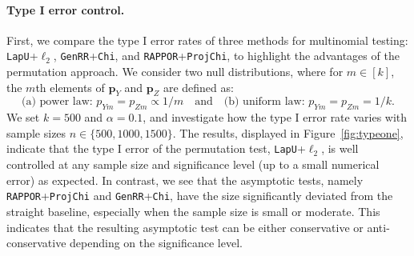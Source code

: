 \documentclass[twoside,11pt]{article}
\newcommand{\rvTwo}{Y}
\newcommand{\rvThree}{Z}
\newcommand{\vectorize}[1]{\mathbf{#1}}
\newcommand{\alphabetSize}{k} %
\newcommand{\vectorIndex}{m}
\newcommand{\probVecElement}[2]{p_{{#1}{#2}}}
\newcommand{\privacyParameter}{\alpha} %
\begin{document}
\paragraph{Type I error control.}
First, we compare the type I error rates of three methods for multinomial testing: \texttt{LapU}+\texttt{$\ell_2$}, \texttt{GenRR}+\texttt{Chi}, and \texttt{RAPPOR}+\texttt{ProjChi}, to highlight the advantages of the permutation approach. We consider two null distributions, where for \( m \in [\alphabetSize] \), the \( m \)th elements of \( \vectorize{p}_Y \) and \( \vectorize{p}_Z \) are defined as:
\begin{equation}\label{nulldist}
	\text{(a) power law: }\probVecElement{\rvTwo}{\vectorIndex} = \probVecElement{\rvThree}{\vectorIndex} \propto 1/\vectorIndex \quad \text{and} \quad \text{(b) uniform law: }\probVecElement{\rvTwo}{\vectorIndex} = \probVecElement{\rvThree}{\vectorIndex}=1/\alphabetSize.
\end{equation}
We set \(\alphabetSize = 500\) and \(\privacyParameter = 0.1\), and investigate how the type I error rate varies with sample sizes $n \in \{500, 1000, 1500\}$. The results, displayed in Figure~\ref{fig:typeone}, indicate that the type I error of the permutation test, \texttt{LapU}+\texttt{$\ell_2$}, is well controlled at any sample size and significance level (up to a small numerical error) as expected. In contrast, we see that the asymptotic tests, namely \texttt{RAPPOR}+\texttt{ProjChi} and \texttt{GenRR}+\texttt{Chi}, have the size significantly deviated from the straight baseline, especially when the sample size is small or moderate. This indicates that the resulting asymptotic test can be either conservative or anti-conservative depending on the significance level.
\end{document}
